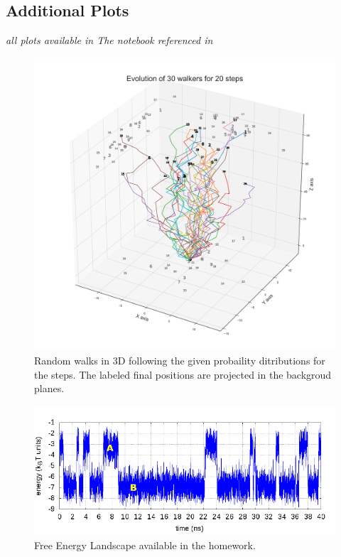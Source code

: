 \documentclass{article}
\begin{document}
\printbibliography
\newpage
\begin{appendices}
\section{Additional Plots}
\textit{all plots available in The notebook referenced  in \cite{script_sims}}
\begin{figure}[h]
\centering

\includegraphics[width=1\textwidth]{imgs/walks.png}
\caption{Random walks in 3D following the given probaility ditributions for the steps. The labeled final positions are projected in the backgroud planes.}
\label{img:walks}
\end{figure}
\begin{figure}[h]
\centering

\includegraphics[width=1\textwidth]{imgs/hw_FELS.png}
\caption{Free Energy  Landscape available in the homework.}
\label{img:FELS}
\end{figure}


\end{appendices}
\end{document}
